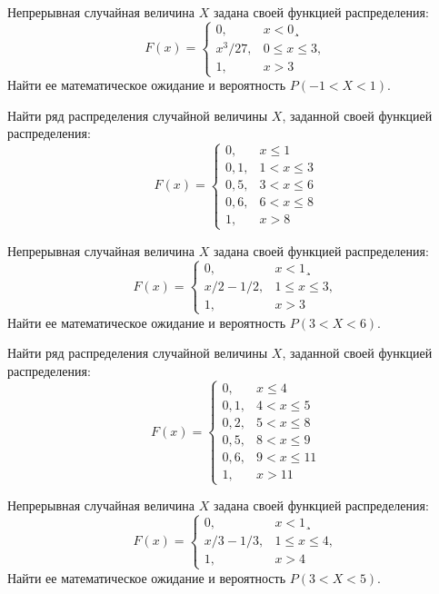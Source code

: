 \vfill

\z Непрерывная случайная величина $X$ задана своей функцией распределения: $$ F(x) = \begin{cases}0, & x < 0¸\\ x^3/27, & 0 \leqslant x \leqslant 3, \\ 1, & x > 3 \end{cases} $$ Найти ее математическое ожидание и вероятность $P(-1 < X < 1)$.
 

\vfill

\newpage\setcounter{zad}{0}

\z Найти ряд распределения случайной величины $X$, заданной своей функцией распределения: $$ F(x) = \begin{cases}0, & x \leqslant 1 \\ 0{,}1, & 1 < x \leqslant 3 \\ 0{,}5, & 3 < x \leqslant 6 \\ 0{,}6, & 6 < x \leqslant 8 \\ 1, & x > 8 \end{cases} $$


\vfill

\z Непрерывная случайная величина $X$ задана своей функцией распределения: $$ F(x) = \begin{cases}0, & x < 1¸\\ x/2-1/2, & 1 \leqslant x \leqslant 3, \\ 1, & x > 3 \end{cases} $$ Найти ее математическое ожидание и вероятность $P(3 < X < 6)$.
 

\vfill

\newpage\setcounter{zad}{0}

\z Найти ряд распределения случайной величины $X$, заданной своей функцией распределения: $$ F(x) = \begin{cases}0, & x \leqslant 4 \\ 0{,}1, & 4 < x \leqslant 5 \\ 0{,}2, & 5 < x \leqslant 8 \\ 0{,}5, & 8 < x \leqslant 9 \\ 0{,}6, & 9 < x \leqslant 11 \\ 1, & x > 11 \end{cases} $$


\vfill

\z Непрерывная случайная величина $X$ задана своей функцией распределения: $$ F(x) = \begin{cases}0, & x < 1¸\\ x/3-1/3, & 1 \leqslant x \leqslant 4, \\ 1, & x > 4 \end{cases} $$ Найти ее математическое ожидание и вероятность $P(3 < X < 5)$.
 

